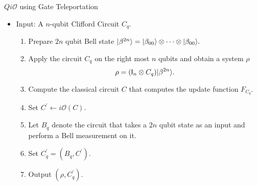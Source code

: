 \begin{algorithm}[H]
\label{QiO:Clifford-teleportation}
   \caption{$Qi\mathcal{O}$ using Gate Teleportation}
  \begin{itemize}
  \item Input: A $n$-qubit Clifford Circuit $C_q.$
  \begin{enumerate}
  \item Prepare $2n$ qubit Bell state ${\lvert}\beta^{ 2n}\rangle={\lvert}\beta_{00}\rangle\otimes \cdots \otimes {\lvert}\beta_{00}\rangle.$
  \item Apply the circuit $C_q$ on the right most $n$ qubits and obtain a system $\rho$
  										 $$\rho=({\sf I}_n\otimes C_q) {\lvert}\beta^{2n}\rangle.$$
 \item Compute the classical circuit $C$ that computes the update function $F_{C_q}.$	
 \item  Set $C^\prime\leftarrow i\mathcal{O}(C).$							
  \item Let $B_q$ denote the circuit that takes a $2n$ qubit state as an input and perform a Bell measurement on it.
  \item Set $C_q^\prime=(B_q, C^\prime).$
  \item Output $\left(\rho,C_q^\prime \right).$
  \end{enumerate}
  \end{itemize}
\end{algorithm}


